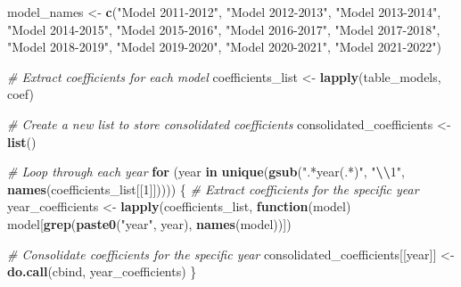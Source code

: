 \documentclass[
]{article}
\newenvironment{Shaded}{\begin{snugshade}}{\end{snugshade}}
\newcommand{\CommentTok}[1]{\textcolor[rgb]{0.56,0.35,0.01}{\textit{#1}}}
\newcommand{\ControlFlowTok}[1]{\textcolor[rgb]{0.13,0.29,0.53}{\textbf{#1}}}
\newcommand{\DecValTok}[1]{\textcolor[rgb]{0.00,0.00,0.81}{#1}}
\newcommand{\FunctionTok}[1]{\textcolor[rgb]{0.13,0.29,0.53}{\textbf{#1}}}
\newcommand{\NormalTok}[1]{#1}
\newcommand{\OtherTok}[1]{\textcolor[rgb]{0.56,0.35,0.01}{#1}}
\newcommand{\SpecialCharTok}[1]{\textcolor[rgb]{0.81,0.36,0.00}{\textbf{#1}}}
\newcommand{\StringTok}[1]{\textcolor[rgb]{0.31,0.60,0.02}{#1}}
\begin{document}
\begin{Shaded}
\begin{Highlighting}[]
\NormalTok{model\_names }\OtherTok{\textless{}{-}} \FunctionTok{c}\NormalTok{(}\StringTok{"Model 2011{-}2012"}\NormalTok{, }\StringTok{"Model 2012{-}2013"}\NormalTok{, }\StringTok{"Model 2013{-}2014"}\NormalTok{, }\StringTok{"Model 2014{-}2015"}\NormalTok{, }\StringTok{"Model 2015{-}2016"}\NormalTok{, }\StringTok{"Model 2016{-}2017"}\NormalTok{, }\StringTok{"Model 2017{-}2018"}\NormalTok{, }\StringTok{"Model 2018{-}2019"}\NormalTok{, }\StringTok{"Model 2019{-}2020"}\NormalTok{, }\StringTok{"Model 2020{-}2021"}\NormalTok{, }\StringTok{"Model 2021{-}2022"}\NormalTok{)}

\CommentTok{\# Extract coefficients for each model}
\NormalTok{coefficients\_list }\OtherTok{\textless{}{-}} \FunctionTok{lapply}\NormalTok{(table\_models, coef)}

\CommentTok{\# Create a new list to store consolidated coefficients}
\NormalTok{consolidated\_coefficients }\OtherTok{\textless{}{-}} \FunctionTok{list}\NormalTok{()}

\CommentTok{\# Loop through each year}
\ControlFlowTok{for}\NormalTok{ (year }\ControlFlowTok{in} \FunctionTok{unique}\NormalTok{(}\FunctionTok{gsub}\NormalTok{(}\StringTok{".*year(.*)"}\NormalTok{, }\StringTok{"}\SpecialCharTok{\textbackslash{}\textbackslash{}}\StringTok{1"}\NormalTok{, }\FunctionTok{names}\NormalTok{(coefficients\_list[[}\DecValTok{1}\NormalTok{]])))) \{}
  \CommentTok{\# Extract coefficients for the specific year}
\NormalTok{  year\_coefficients }\OtherTok{\textless{}{-}} \FunctionTok{lapply}\NormalTok{(coefficients\_list, }\ControlFlowTok{function}\NormalTok{(model) model[}\FunctionTok{grep}\NormalTok{(}\FunctionTok{paste0}\NormalTok{(}\StringTok{"year"}\NormalTok{, year), }\FunctionTok{names}\NormalTok{(model))])}
  
  \CommentTok{\# Consolidate coefficients for the specific year}
\NormalTok{  consolidated\_coefficients[[year]] }\OtherTok{\textless{}{-}} \FunctionTok{do.call}\NormalTok{(cbind, year\_coefficients)}
\NormalTok{\}}
\end{Highlighting}
\end{Shaded}
\end{document}
